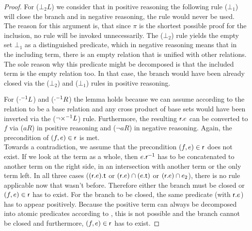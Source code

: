 \documentclass[a4paper,twoside,12pt, english]{article}
\begin{document}
\begin{proof}
For ($\bot_2 L$) we consider that in positive reasoning the following rule ($\bot_1$) will close the branch and in negative reasoning, the rule would never be used. \\
The reason for this argument is, that since $\pi$ is the shortest possible proof for the inclusion, no rule will be invoked unnecessarily. The ($\bot_2$) rule yields the empty set $\bot_1$ as a distinguished predicate, which in negative reasoning means that in the including term, there is an empty relation that is unified with other relations. 
The sole reason why this predicate might be decomposed is that the included term is the empty relation too. In that case, the branch would have been already closed via the ($\bot_2$) and ($\bot_1$) rules in positive reasoning. 

For ($\cdot^{{-1}} L$) and ($\cdot^{{-1}} R$) the lemma holds because we can assume according to  the relation to be a base relation and any cross product of base sets would have been inverted via the ($\neg {\times}^{{-1}} L$) rule. Furthermore, the resulting $\textsf{\upshape r}.e$ can be converted to $f$ via ($aR$) in positive reasoning and ($\neg aR$) in negative reasoning. Again, the precondition of $(f,e) \in \textsf{\upshape r}$ is met. \\
Towards a contradiction, we assume that the precondition $(f,e) \in \textsf{\upshape r}$ does not exist. If we look at the term as a whole, then $e.\textsf{\upshape r}^{{-1}}$ has to be concatenated to another term on the right side, in an intersection with another term or the only term left. In all three cases ($(\textsf{\upshape r}.e).\textsf{\upshape t}$ or $(\textsf{\upshape r}.e) \cap (e.\textsf{\upshape t})$ or $(\textsf{\upshape r}.e) \cap e_2$), there is no rule applicable now that wasn't before. Therefore either the branch must be closed or $(f,e) \in \textsf{\upshape r}$ has to exist. For the branch to be closed, the same predicate (with $\textsf{\upshape r}.e$) has to appear positively. Because the positive term can always be decomposed into atomic predicates according to \cite{Gru+26}, this is not possible and the branch cannot be closed and furthermore, $(f,e) \in \textsf{\upshape r}$ has to exist.
\end{proof}
\end{document}
